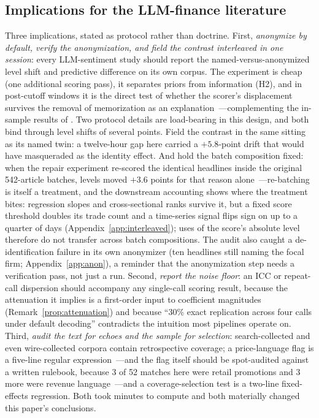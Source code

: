 \subsection{Implications for the LLM-finance literature}

Three implications, stated as protocol rather than doctrine. First, \emph{anonymize by default, verify the anonymization, and field the contrast interleaved in one session}: every LLM-sentiment study should report the named-versus-anonymized level shift and predictive difference on its own corpus. The experiment is cheap (one additional scoring pass), it separates priors from information (H2), and in post-cutoff windows it is the direct test of whether the scorer's displacement survives the removal of memorization as an explanation~---complementing the in-sample results of \citet{glasserman2023}. Two protocol details are load-bearing in this design, and both bind through level shifts of several points. Field the contrast in the same sitting as its named twin: a twelve-hour gap here carried a $+5.8$-point drift that would have masqueraded as the identity effect. And hold the batch composition fixed: when the repair experiment re-scored the identical headlines inside the original 542-article batches, levels moved $+3.6$ points for that reason alone~---re-batching is itself a treatment, and the downstream accounting shows where the treatment bites: regression slopes and cross-sectional ranks survive it, but a fixed score threshold doubles its trade count and a time-series signal flips sign on up to a quarter of days (Appendix~\ref{app:interleaved}); uses of the score's absolute level therefore do not transfer across batch compositions. The audit also caught a de-identification failure in its own anonymizer (ten headlines still naming the focal firm; Appendix~\ref{app:anon}), a reminder that the anonymization step needs a verification pass, not just a run. Second, \emph{report the noise floor}: an ICC or repeat-call dispersion should accompany any single-call scoring result, because the attenuation it implies is a first-order input to coefficient magnitudes (Remark~\ref{prop:attenuation}) and because ``30\% exact replication across four calls under default decoding'' contradicts the intuition most pipelines operate on. Third, \emph{audit the text for echoes and the sample for selection}: search-collected and even wire-collected corpora contain retrospective coverage; a price-language flag is a five-line regular expression~---and the flag itself should be spot-audited against a written rulebook, because 3 of 52 matches here were retail promotions and 3 more were revenue language~---and a coverage-selection test is a two-line fixed-effects regression. Both took minutes to compute and both materially changed this paper's conclusions.

